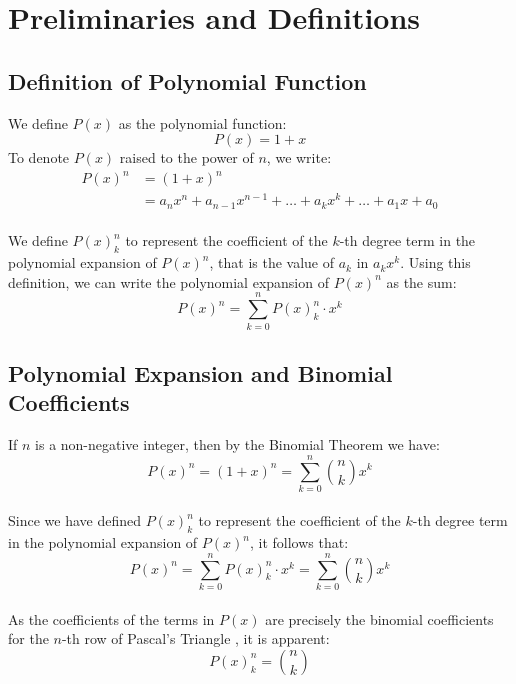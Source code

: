 \documentclass{article}
\theoremstyle{plain}
\begin{document}
\section{Preliminaries and Definitions}

\subsection{Definition of Polynomial Function}
We define $P(x)$ as the polynomial function:
\begin{equation}
P(x) = 1 + x
\end{equation}
To denote $P(x)$ raised to the power of $n$, we write:
\begin{align*}
P(x)^{n} &= (1 + x)^{n} \\
&= a_n x^n + a_{n-1} x^{n-1} + \ldots + a_k x^k + \ldots + a_1 x + a_0
\end{align*}
\\
We define $P(x)^{n}_{k}$ to represent the coefficient of the $k$-th degree term in the polynomial expansion of $P(x)^{n}$, that is the value of $a_k$ in $a_k x^k$. Using this definition, we can write the polynomial expansion of $P(x)^{n}$ as the sum:
\begin{equation}
P(x)^{n} = \sum_{k=0}^{n} P(x)^{n}_{k} \cdot x^{k}
\end{equation}

\subsection{Polynomial Expansion and Binomial Coefficients}

If $n$ is a non-negative integer, then by the Binomial Theorem \cite{stewart2007calculus} we have:
\begin{equation}
P(x)^{n} = (1 + x)^{n} = \sum_{k=0}^{n} \binom{n}{k} x^{k}
\end{equation}
\\
Since we have defined $P(x)^{n}_{k}$ to represent the coefficient of the $k$-th degree term in the polynomial expansion of $P(x)^{n}$, it follows that:
\begin{equation}
P(x)^{n} = \sum_{k=0}^{n} P(x)^{n}_{k} \cdot x^{k} = \sum_{k=0}^{n} \binom{n}{k} x^{k}
\end{equation}
\\
As the coefficients of the terms in $P(x)$ are precisely the binomial coefficients for the $n$-th row of Pascal's Triangle \cite{rosen2011discrete}, it is apparent:
\begin{equation}
P(x)^{n}_{k} = \binom{n}{k}
\end{equation}
\end{document}
